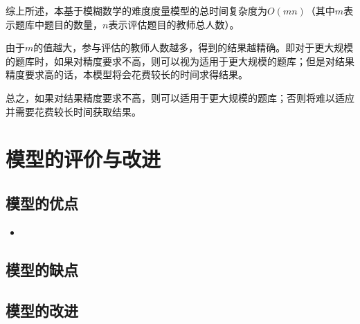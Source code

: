 综上所述，本基于模糊数学的难度度量模型的总时间复杂度为$O(mn)$（其中$m$表示题库中题目的数量，$n$表示评估题目的教师总人数）。

由于$m$的值越大，参与评估的教师人数越多，得到的结果越精确。即对于更大规模的题库时，如果对精度要求不高，则可以视为适用于更大规模的题库；但是对结果精度要求高的话，本模型将会花费较长的时间求得结果。

总之，如果对结果精度要求不高，则可以适用于更大规模的题库；否则将难以适应并需要花费较长时间获取结果。

%
%

\section{模型的评价与改进}

\subsection{模型的优点}

\begin{itemize}
    \item 
\end{itemize}

\subsection{模型的缺点}

\subsection{模型的改进}
